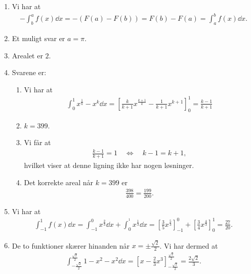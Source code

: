 \begin{enumerate}
	
	\item \label{it:bes3ans} Vi har at
	\begin{align*}
	-\int_b^a f(x)\dd x=-(F(a)-F(b))=F(b)-F(a)=\int_a^b f(x)\dd x.
	\end{align*}
	
	\item Et muligt svar er $a=\pi$.
	
	\item Arealet er $2$.
	

	
	
	
	\item Svarene er:
	\begin{enumerate}
		\item Vi har at
		\begin{align*}
		\int_0^1 x^{\frac{1}{k}}-x^k\dd x=[\frac{k}{k+1}x^{\frac{k+1}{k}}-\frac{1}{k+1}x^{k+1}  ]_0^1=\frac{k-1}{k+1}
		\end{align*}
		\item $k=399$.	
		\item Vi får at
		\begin{align*}
		\frac{k-1}{k+1}=1\quad\Leftrightarrow\quad k-1=k+1,
		\end{align*}
		hvilket viser at denne ligning ikke har nogen løsninger.
		\item Det korrekte areal når $k=399$ er
		\begin{align*}
		\frac{398}{400}=\frac{199}{200}.
		\end{align*}
		
		\end{enumerate}
	
	\item Vi har at
	\begin{align*}
	\int_{-1}^{1}f(x)\dd x=\int_{-1}^{0}x^{\frac{2}{3}}\dd x+\int_{0}^{^1} x^{\frac{1}{3}}\dd x=[\frac{3}{5}x^{\frac{5}{3}}]_{-1}^0+[\frac{3}{4}x^{\frac{4}{3}}]_0^1=\frac{27}{20}.
	\end{align*}
	
	


	\item De to funktioner skærer hinanden når $x=\pm \frac{\sqrt{2}}{2}$. Vi har dermed at 
	\begin{align*}
	\int_{-\frac{\sqrt{2}}{2}}^\frac{\sqrt{2}}{2} 1-x^2-x^2\dd x=[x-\frac{2}{3}x^{3}]_{-\frac{\sqrt{2}}{2}}^\frac{\sqrt{2}}{2}=\frac{2\sqrt{2}}{3}.
	\end{align*}
	

\end{enumerate}
